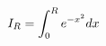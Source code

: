 \documentclass[preview]{standalone}
\begin{document}
\begin{align*}
\special{dvisvgm:raw <g id='unique000'>}I_R=\int_0^R e^{-x^2}dx\special{dvisvgm:raw </g>}
\end{align*}
\end{document}
